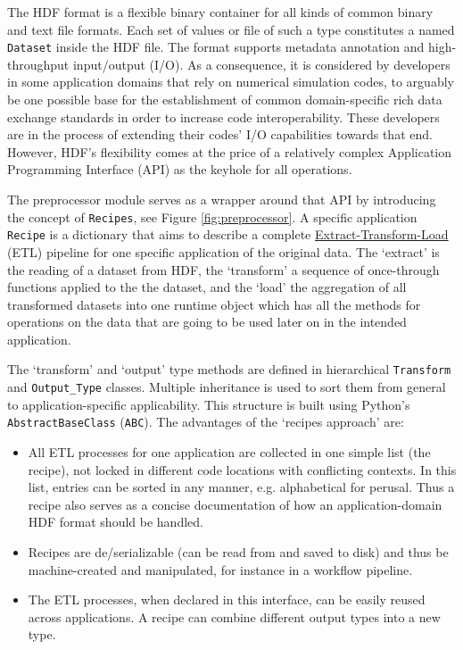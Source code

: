 The HDF format is a flexible binary container for all kinds of common binary and
text file formats. Each set of values or file of such a type constitutes a named
\texttt{Dataset} inside the HDF file. The format supports metadata annotation
and high-throughput input/output (I/O). As a consequence, it is considered by
developers in some application domains that rely on numerical simulation codes,
to arguably be one possible base for the establishment of common domain-specific
rich data exchange standards in order to increase code interoperability. These
developers are in the process of extending their codes' I/O capabilities towards
that end. However, HDF's flexibility comes at the price of a relatively complex
Application Programming Interface (API) as the keyhole for all operations.

The preprocessor module serves as a wrapper around that API by introducing the
concept of \texttt{Recipes}, see Figure \ref{fig:preprocessor}. A specific
application \texttt{Recipe} is a dictionary that aims to describe a complete
\href{https://en.wikipedia.org/wiki/Extract,_transform,_load}{Extract-Transform-Load}
(ETL) pipeline for one specific application of the original data. The `extract'
is the reading of a dataset from HDF, the `transform' a sequence of once-through
functions applied to the the dataset, and the `load' the aggregation of all
transformed datasets into one runtime object which has all the methods for
operations on the data that are going to be used later on in the intended
application.

The `transform' and `output' type methods are defined in hierarchical
\texttt{Transform} and \texttt{Output\_Type} classes. Multiple inheritance is
used to sort them from general to application-specific applicability. This
structure is built using Python's \texttt{AbstractBaseClass} (\texttt{ABC}). The
advantages of the `recipes approach' are:
\begin{itemize}
\item All ETL processes for one application are collected in one simple list
    (the recipe), not locked in different code locations with conflicting
    contexts. In this list, entries can be sorted in any manner, e.g.
    alphabetical for perusal. Thus a recipe also serves as a concise
    documentation of how an application-domain HDF format should be handled.
\item Recipes are de/serializable (can be read from and saved to disk) and thus be
    machine-created and manipulated, for instance in a workflow pipeline.
\item The ETL processes, when declared in this interface, can be easily reused
    across applications. A recipe can combine different output types into a new
    type.
\end{itemize}

